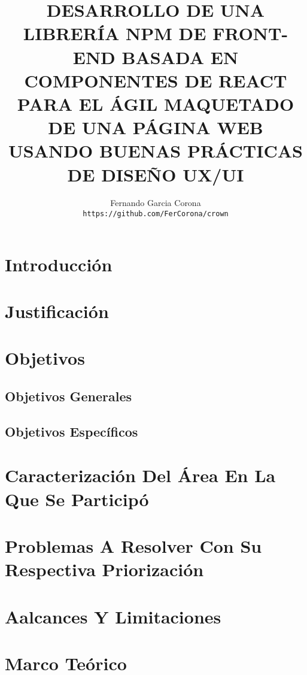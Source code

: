 \documentclass[a4paper,12pt]{report}
\author{
  Fernando Garcia Corona\\
  \texttt{https://github.com/FerCorona/crown}
}
\title{DESARROLLO DE UNA LIBRERÍA NPM DE FRONT-END BASADA EN COMPONENTES DE REACT PARA EL ÁGIL MAQUETADO DE UNA PÁGINA WEB USANDO BUENAS PRÁCTICAS DE DISEÑO UX/UI}
\begin{document}
	\maketitle
	
	\tableofcontents
		
		\listoffigures
		
		\chapter {Introducción}
			
		\chapter {Justificación }
			
		
		\chapter {Objetivos }
			\section {Objetivos Generales}
				
			
			\section {Objetivos Específicos} 
				
		
		\chapter {Caracterización Del Área En La Que Se Participó  }
			
		
		\chapter {Problemas A Resolver Con Su Respectiva Priorización }
			
			
		\chapter {Aalcances Y Limitaciones }
				
		
		\chapter {Marco Teórico  }
			
		
\end{document}
